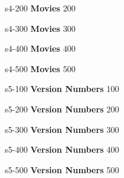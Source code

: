 \documentclass{beamer}
\def \fourthcat {\textbf{Movies}}
\def \fifthcat {\textbf{Version Numbers}}
\begin{document}
	\content
	{s4-200}
	{\fourthcat}
	{200}{
    \db
	}


	\content
	{s4-300}
	{\fourthcat}
	{300}{
    \dc
	}


	\content
	{s4-400}
	{\fourthcat}
	{400}{
    \dd
	}


	\content
	{s4-500}
	{\fourthcat}
	{500}{
    \de
	}


	\content
	{s5-100}
	{\fifthcat}
	{100}{
    \ea
	}


	\content
	{s5-200}
	{\fifthcat}
	{200}{
    \eb
	}


	\content
	{s5-300}
	{\fifthcat}
	{300}{
    \ec
	}


	\content
	{s5-400}
	{\fifthcat}
	{400}{
    \ed
	}


	\content
	{s5-500}
	{\fifthcat}
	{500}{
    \ee
	}
\end{document}
